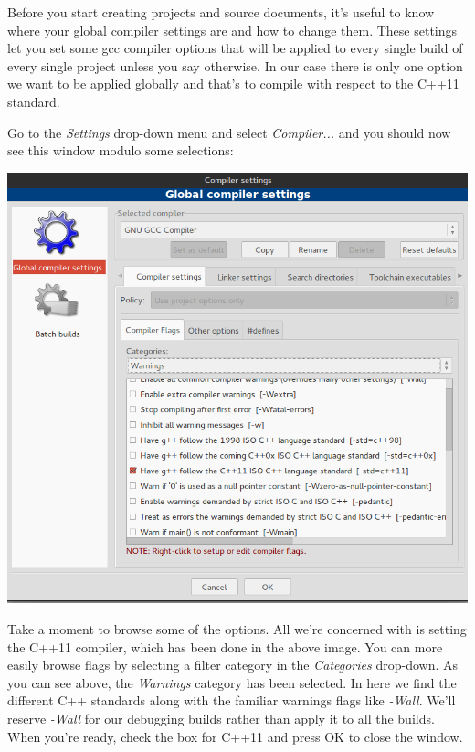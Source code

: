 \documentclass[10pt]{article}
\begin{document}
Before you start creating projects and source documents, it's useful to know where your global compiler settings are and how to change them. These settings let you set some gcc compiler options that will be applied to every single build of every single project unless you say otherwise. In our case there is only one option we want to be applied globally and that's to compile with respect to the C++11 standard. 


Go to the \textit{Settings} drop-down menu and select \textit{Compiler...} and you should now see this window modulo some selections:

\vspace{.1in}
\begin{center}
\includegraphics[scale=.5]{CB_GlobalCompiler.png}
\end{center}
\vspace{.1in}

Take a moment to browse some of the options. 	All we're concerned with is setting the C++11 compiler, which has been done in the above image. You can more easily browse flags by selecting a filter category in the \textit{Categories} drop-down. As you can see above, the \textit{Warnings} category has been selected. In here we find the different C++ standards along with the familiar warnings flags like \textit{-Wall}.  We'll reserve \textit{-Wall} for our debugging builds rather than apply it to all the builds. When you're ready, check the box for C++11 and press OK to close the window.
\end{document}
